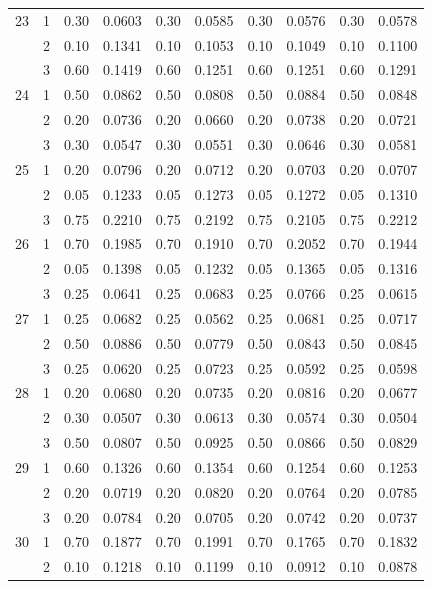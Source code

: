 \begin{longtable}{llcccccccc}
  23 & 1 & 0.30 & 0.0603 & 0.30 & 0.0585 & 0.30 & 0.0576 & 0.30 & 0.0578 \\ 
   & 2 & 0.10 & 0.1341 & 0.10 & 0.1053 & 0.10 & 0.1049 & 0.10 & 0.1100 \\ 
   & 3 & 0.60 & 0.1419 & 0.60 & 0.1251 & 0.60 & 0.1251 & 0.60 & 0.1291 \\ 
  24 & 1 & 0.50 & 0.0862 & 0.50 & 0.0808 & 0.50 & 0.0884 & 0.50 & 0.0848 \\ 
   & 2 & 0.20 & 0.0736 & 0.20 & 0.0660 & 0.20 & 0.0738 & 0.20 & 0.0721 \\ 
   & 3 & 0.30 & 0.0547 & 0.30 & 0.0551 & 0.30 & 0.0646 & 0.30 & 0.0581 \\ 
  25 & 1 & 0.20 & 0.0796 & 0.20 & 0.0712 & 0.20 & 0.0703 & 0.20 & 0.0707 \\ 
   & 2 & 0.05 & 0.1233 & 0.05 & 0.1273 & 0.05 & 0.1272 & 0.05 & 0.1310 \\ 
   & 3 & 0.75 & 0.2210 & 0.75 & 0.2192 & 0.75 & 0.2105 & 0.75 & 0.2212 \\ 
  26 & 1 & 0.70 & 0.1985 & 0.70 & 0.1910 & 0.70 & 0.2052 & 0.70 & 0.1944 \\ 
   & 2 & 0.05 & 0.1398 & 0.05 & 0.1232 & 0.05 & 0.1365 & 0.05 & 0.1316 \\ 
   & 3 & 0.25 & 0.0641 & 0.25 & 0.0683 & 0.25 & 0.0766 & 0.25 & 0.0615 \\ 
  27 & 1 & 0.25 & 0.0682 & 0.25 & 0.0562 & 0.25 & 0.0681 & 0.25 & 0.0717 \\ 
   & 2 & 0.50 & 0.0886 & 0.50 & 0.0779 & 0.50 & 0.0843 & 0.50 & 0.0845 \\ 
   & 3 & 0.25 & 0.0620 & 0.25 & 0.0723 & 0.25 & 0.0592 & 0.25 & 0.0598 \\ 
  28 & 1 & 0.20 & 0.0680 & 0.20 & 0.0735 & 0.20 & 0.0816 & 0.20 & 0.0677 \\ 
   & 2 & 0.30 & 0.0507 & 0.30 & 0.0613 & 0.30 & 0.0574 & 0.30 & 0.0504 \\ 
   & 3 & 0.50 & 0.0807 & 0.50 & 0.0925 & 0.50 & 0.0866 & 0.50 & 0.0829 \\ 
  29 & 1 & 0.60 & 0.1326 & 0.60 & 0.1354 & 0.60 & 0.1254 & 0.60 & 0.1253 \\ 
   & 2 & 0.20 & 0.0719 & 0.20 & 0.0820 & 0.20 & 0.0764 & 0.20 & 0.0785 \\ 
   & 3 & 0.20 & 0.0784 & 0.20 & 0.0705 & 0.20 & 0.0742 & 0.20 & 0.0737 \\ 
  30 & 1 & 0.70 & 0.1877 & 0.70 & 0.1991 & 0.70 & 0.1765 & 0.70 & 0.1832 \\ 
   & 2 & 0.10 & 0.1218 & 0.10 & 0.1199 & 0.10 & 0.0912 & 0.10 & 0.0878 \\ 

\end{longtable}
